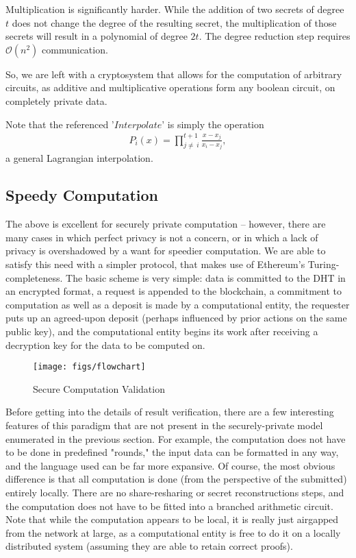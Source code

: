 \documentclass[journal]{IEEEtran}
\begin{document}
\par Multiplication is significantly harder. While the addition of two secrets of degree $t$ does not change the degree of the resulting secret, the multiplication of those secrets will result in a polynomial of degree $2t$. The degree reduction step requires $\mathcal{O}(n^2)$ communication. 

\par So, we are left with a cryptosystem that allows for the computation of arbitrary circuits, as additive and multiplicative operations form any boolean circuit, on completely private data.

\par Note that the referenced '$Interpolate$' is simply the operation
\begin{gather} 
P_i(x) = \prod_{j\neq\,i}^{t+1} \frac{x - x_j}{x_i - x_j},
\end{gather}
a general Lagrangian interpolation. 

\subsection{Speedy Computation}
\par The above is excellent for securely private computation -- however, there are many cases in which perfect privacy is not a concern, or in which a lack of privacy is overshadowed by a want for speedier computation. We are able to satisfy this need with a simpler protocol, that makes use of Ethereum's Turing-completeness. The basic scheme is very simple: data is committed to the DHT in an encrypted format, a request is appended to the blockchain, a commitment to computation as well as a deposit is made by a computational entity, the requester puts up an agreed-upon deposit (perhaps influenced by prior actions on the same public key), and the computational entity begins its work after receiving a decryption key for the data to be computed on.
\begin{figure}
  \centering
  \texttt{[image: figs/flowchart]}
  \caption{Secure Computation Validation}
  \label{validation}
\end{figure}
\par Before getting into the details of result verification, there are a few interesting features of this paradigm that are not present in the securely-private model enumerated in the previous section. For example, the computation does not have to be done in predefined "rounds," the input data can be formatted in any way, and the language used can be far more expansive. Of course, the most obvious difference is that all computation is done (from the perspective of the submitted) entirely locally. There are no share-resharing or secret reconstructions steps, and the computation does not have to be fitted into a branched arithmetic circuit. Note that while the computation appears to be local, it is really just airgapped from the network at large, as a computational entity is free to do it on a locally distributed system (assuming they are able to retain correct proofs).
\end{document}
